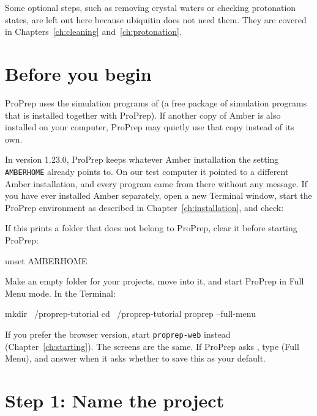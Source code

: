 Some optional steps, such as removing crystal waters or checking protonation
states, are left out here because ubiquitin does not need them. They are
covered in Chapters~\ref{ch:cleaning} and~\ref{ch:protonation}.

\section{Before you begin}\label{sec:tutorial-before}

ProPrep uses the simulation programs of  (a free package of
simulation programs that is installed together with ProPrep). If another copy
of Amber is also installed on your computer, ProPrep may quietly use that copy
instead of its own.

\begin{watchout}
In version 1.23.0, ProPrep keeps whatever Amber installation the setting
\texttt{AMBERHOME} already points to. On our test computer it pointed to a
different Amber installation, and every program came from there without any
message. If you have ever installed Amber separately, open a new Terminal
window, start the ProPrep environment as described in
Chapter~\ref{ch:installation}, and check:
If this prints a folder that does not belong to ProPrep, clear it before
starting ProPrep:
\begin{terminal}
unset AMBERHOME
\end{terminal}
\end{watchout}

Make an empty folder for your projects, move into it, and start ProPrep in Full
Menu mode. In the Terminal:

\begin{terminal}
mkdir ~/proprep-tutorial
cd ~/proprep-tutorial
proprep --full-menu
\end{terminal}

If you prefer the browser version, start \texttt{proprep-web} instead
(Chapter~\ref{ch:starting}). The screens are the same. If ProPrep asks
, type  (Full Menu), and answer 
when it asks whether to save this as your default.

\section{Step 1: Name the project}

